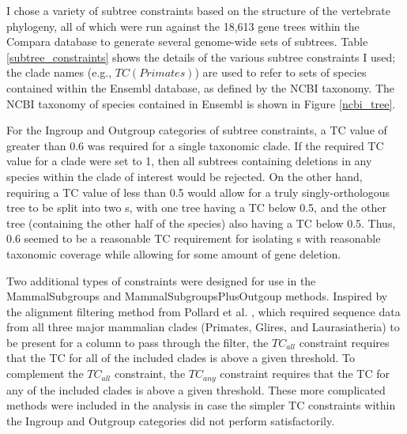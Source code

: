 I chose a variety of subtree constraints based on the structure of the
vertebrate phylogeny, all of which were run against the 18,613 gene
trees within the Compara database to generate several genome-wide sets
of subtrees. Table \ref{subtree_constraints} shows the details of the
various subtree constraints I used; the clade names (e.g.,
$TC(Primates)$) are used to refer to sets of species contained within
the Ensembl database, as defined by the NCBI taxonomy. The NCBI
taxonomy of species contained in Ensembl is shown in Figure
\ref{ncbi_tree}.

For the Ingroup and Outgroup categories of subtree constraints, a TC
value of greater than 0.6 was required for a single taxonomic
clade. If the required TC value for a clade were set to 1, then all
subtrees containing deletions in any species within the clade of
interest would be rejected. On the other hand, requiring a TC value of
less than 0.5 would allow for a truly singly-orthologous tree to be
split into two \subtr{}s, with one tree having a TC below 0.5, and the
other tree (containing the other half of the species) also having a TC
below 0.5. Thus, 0.6 seemed to be a reasonable TC requirement for
isolating \subtr{}s with reasonable taxonomic coverage while allowing
for some amount of gene deletion.

Two additional types of constraints were designed for use in the
MammalSubgroups and MammalSubgroupsPlusOutgoup methods. Inspired by
the alignment filtering method from Pollard et al. \citeyearpar{Pollard2010},
which required sequence data from all three major mammalian clades
(Primates, Glires, and Laurasiatheria) to be present for a column to
pass through the filter, the $TC_{all}$ constraint requires that the
TC for all of the included clades is above a given threshold. To
complement the $TC_{all}$ constraint, the $TC_{any}$ constraint
requires that the TC for any of the included clades is above a given
threshold. These more complicated methods were included in the
analysis in case the simpler TC constraints within the Ingroup and
Outgroup categories did not perform satisfactorily.


